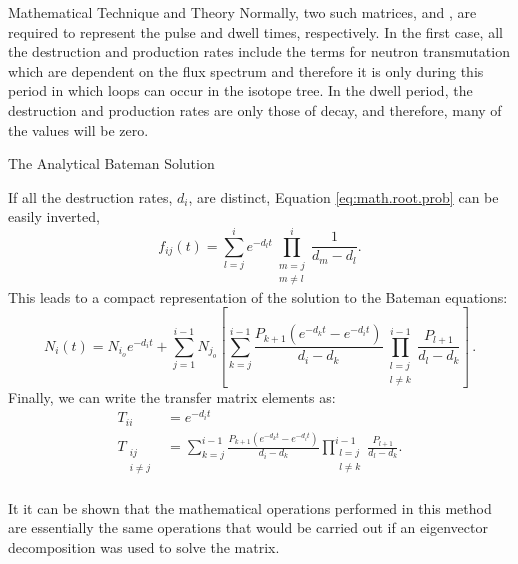 \begin{chapter}{Mathematical Technique and Theory\label{chap:math}}
  Normally, two such matrices,  and , are required to
  represent the pulse and dwell times, respectively.  In the first
  case, all the destruction and production rates include the terms for
  neutron transmutation which are dependent on the flux spectrum and
  therefore it is only during this period in which loops can occur in
  the isotope tree.  In the dwell period, the destruction and
  production rates are only those of decay, and therefore, many of the
  values will be zero.

  \begin{section}{The Analytical Bateman Solution}\label{sec:math.bateman}
    
    If all the destruction rates, $d_i$, are distinct, Equation
    \ref{eq:math.root.prob} can be easily inverted,
    \begin{equation}
      f_{ij}(t) = \sum_{l=j}^{i} e^{-d_l t} 
      \prod_{\substack{
          m=j \\
          m\neq l
          }}^i
      \frac{1}{d_m - d_l}\label{eqn:math.bateman.inversion}.
    \end{equation}
    This leads to a compact representation of the solution to the
    Bateman equations:
    \begin{equation}
      N_i(t) = N_{i_o}e^{-d_i t} + \sum_{j=1}^{i-1}N_{j_o}\left [
        \sum_{k=j}^{i-1}\frac{P_{k+1}(e^{-d_k t} - e^{-d_i t})}{d_i -
          d_k}\prod_{\substack{l=j\\l\neq k}}^{i-1}\frac{P_{l+1}}{d_l-d_k}\right] \, .
    \end{equation}
    Finally, we can write the transfer matrix elements as:
    \begin{equation}
      \begin{split}
        T_{ii} &= e^{-d_i t}\\
        T_{\substack{ij\\i\neq j}} &= \sum_{k=j}^{i-1}\frac{P_{k+1}(e^{-d_k t} - e^{-d_i t})}{d_i -
          d_k}\prod_{\substack{l=j\\l\neq k}}^{i-1}\frac{P_{l+1}}{d_l-d_k}.\label{eqn:math.bateman.final}\\
      \end{split}
    \end{equation}
  
    It it can be shown that the mathematical operations performed in
    this method are essentially the same operations that would be
    carried out if an eigenvector decomposition was used to solve the
    matrix.


\end{section}
\end{chapter}
